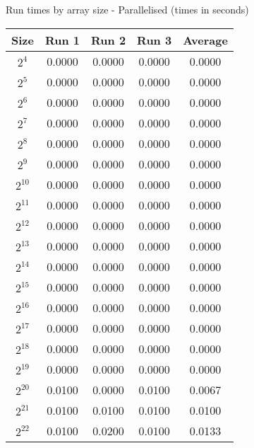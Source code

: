 \centering
\caption{Run times by array size - Parallelised (times in seconds)}
\begin{tabular}{@{} c c c c c @{}}
\toprule
    \textbf{Size} & \textbf{Run 1}& \textbf{Run 2}& \textbf{Run 3}& \textbf{Average}\\
\midrule
    $2^4$ & 0.0000 & 0.0000 & 0.0000 & 0.0000\\
\lightrule
    $2^5$ & 0.0000 & 0.0000 & 0.0000 & 0.0000\\
\lightrule
    $2^6$ & 0.0000 & 0.0000 & 0.0000 & 0.0000\\
\lightrule
    $2^7$ & 0.0000 & 0.0000 & 0.0000 & 0.0000\\
\lightrule
    $2^8$ & 0.0000 & 0.0000 & 0.0000 & 0.0000\\
\lightrule
    $2^9$ & 0.0000 & 0.0000 & 0.0000 & 0.0000\\
\lightrule
    $2^{10}$ & 0.0000 & 0.0000 & 0.0000 & 0.0000\\
\lightrule
    $2^{11}$ & 0.0000 & 0.0000 & 0.0000 & 0.0000\\
\lightrule
    $2^{12}$ & 0.0000 & 0.0000 & 0.0000 & 0.0000\\
\lightrule
    $2^{13}$ & 0.0000 & 0.0000 & 0.0000 & 0.0000\\
\lightrule
    $2^{14}$ & 0.0000 & 0.0000 & 0.0000 & 0.0000\\
\lightrule
    $2^{15}$ & 0.0000 & 0.0000 & 0.0000 & 0.0000\\
\lightrule
    $2^{16}$ & 0.0000 & 0.0000 & 0.0000 & 0.0000\\
\lightrule
    $2^{17}$ & 0.0000 & 0.0000 & 0.0000 & 0.0000\\
\lightrule
    $2^{18}$ & 0.0000 & 0.0000 & 0.0000 & 0.0000\\
\lightrule
    $2^{19}$ & 0.0000 & 0.0000 & 0.0000 & 0.0000\\
\lightrule
    $2^{20}$ & 0.0100 & 0.0000 & 0.0100 & 0.0067\\
\lightrule
    $2^{21}$ & 0.0100 & 0.0100 & 0.0100 & 0.0100\\
\lightrule
    $2^{22}$ & 0.0100 & 0.0200 & 0.0100 & 0.0133\\
\bottomrule
\end{tabular}
\label{table:array_par_cluster}
